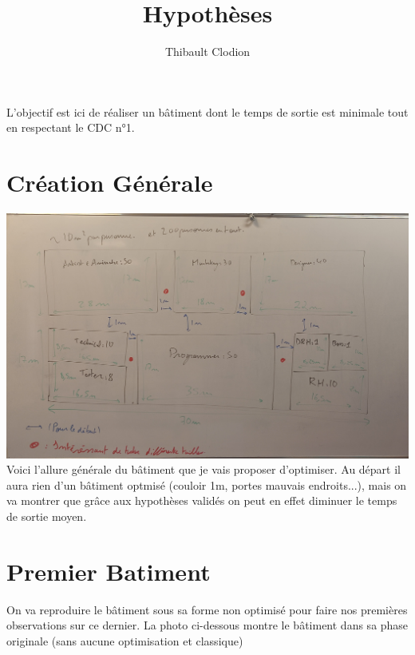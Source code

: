 \documentclass[12pt]{article}
\title{Hypothèses}
\author{Thibault Clodion}
\begin{document}
\maketitle %

L'objectif est ici de réaliser un bâtiment dont le temps de sortie est minimale tout en 
respectant le CDC n°1.

\section{Création Générale}

\includegraphics[scale=0.15]{Batiment optimisé croquis.jpg}
\newline\newline
Voici l'allure générale du bâtiment que je vais proposer d'optimiser.
\newline
Au départ il aura rien d'un bâtiment optmisé (couloir 1m, portes mauvais endroits...), mais 
on va montrer que grâce aux hypothèses validés on peut en effet diminuer le temps de sortie moyen.

\section{Premier Batiment}
On va reproduire le bâtiment sous sa forme non optimisé pour faire nos premières observations sur ce dernier.
\newline\newline
La photo ci-dessous montre le bâtiment dans sa phase originale (sans aucune optimisation et classique)
\end{document}
